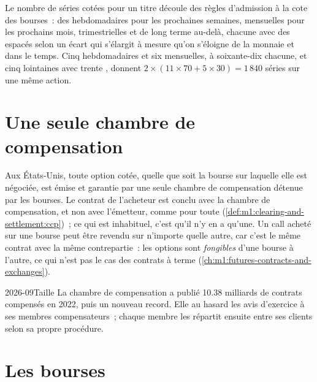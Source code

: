 Le nombre de séries cotées pour un titre découle des règles d'admission à la cote des bourses~:
des  hebdomadaires pour les prochaines semaines, mensuelles pour les
prochains mois, trimestrielles et de long terme au-delà, chacune avec des  espacés selon un écart qui s'élargit à mesure qu'on s'éloigne de la monnaie et dans le temps. Cinq  hebdomadaires
et six mensuelles, à soixante-dix  chacune, et cinq  lointaines avec
trente , donnent $2 \times (11 \times 70 + 5 \times 30) = 1\,840$ séries sur une
même action.

\section{Une seule chambre de compensation}

Aux États-Unis, toute option cotée, quelle que soit la bourse sur laquelle elle est négociée,
est émise et garantie par une seule chambre de compensation détenue par les bourses.
Le contrat de l'acheteur est conclu avec la chambre de compensation, et non avec l'émetteur, comme pour
toute  (\cref{def:m1:clearing-and-settlement:ccp})~; ce qui est
inhabituel, c'est qu'il n'y en a qu'une. Un call acheté sur une bourse peut être revendu
sur n'importe quelle autre, car c'est le même contrat avec la même contrepartie~:
les options sont \emph{fongibles} d'une bourse à l'autre, ce qui n'est pas le cas des
contrats à terme (\cref{ch:m1:futures-contracts-and-exchanges}).

\begin{dated}{2026-09}{Taille}\label{dat:m1:option-contracts-and-exchanges:occ}
La chambre de compensation a publié 10.38 milliards de contrats compensés en 2022, puis
un nouveau record. Elle  au hasard les avis d'exercice à ses membres compensateurs~; chaque
membre les répartit ensuite entre ses clients selon sa propre procédure.
\end{dated}

\section{Les bourses}

